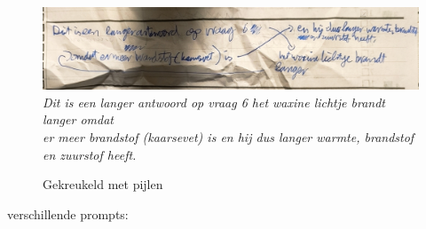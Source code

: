 \documentclass[12pt]{article}
\begin{document}
\begin{multicols}{2}
\begin{figure}[H]
    \label{fig:enter-label}
\end{figure}
\begin{figure}[H]
    \centering
    \includegraphics[width=1\linewidth]{./images/methoden/inscannen/tekst/gekreukeld_met_pijlen.png}
    \textit{Dit is een langer antwoord op vraag 6 het waxine lichtje brandt langer omdat \\
er meer brandstof (kaarsevet) is en hij dus langer warmte, brandstof en zuurstof heeft.}
    \caption{Gekreukeld met pijlen}
    \label{fig:enter-label}
\end{figure}


\end{multicols}
\pagebreak
{} verschillende prompts:\\
\end{document}
